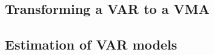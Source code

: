 \documentclass[11pt]{article}
\begin{document}
\subsection{Transforming a VAR to a VMA}


\subsection{Estimation of VAR models}
% 










\printbibliography
\end{document}
